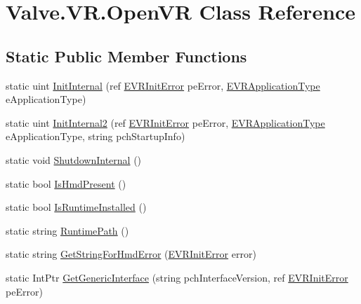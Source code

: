 \hypertarget{class_valve_1_1_v_r_1_1_open_v_r}{}\section{Valve.\+V\+R.\+Open\+VR Class Reference}
\label{class_valve_1_1_v_r_1_1_open_v_r}
\subsection*{Static Public Member Functions}
\begin{DoxyCompactItemize}
\item 
static uint \mbox{\hyperlink{class_valve_1_1_v_r_1_1_open_v_r_a416675ba428968a6da50f9490efce76b}{Init\+Internal}} (ref \mbox{\hyperlink{namespace_valve_1_1_v_r_a5d8a20b60549ae5b7668d73452c7e83e}{E\+V\+R\+Init\+Error}} pe\+Error, \mbox{\hyperlink{namespace_valve_1_1_v_r_a75c95b1b332a3c064198f2eac92ffe07}{E\+V\+R\+Application\+Type}} e\+Application\+Type)
\item 
static uint \mbox{\hyperlink{class_valve_1_1_v_r_1_1_open_v_r_addca6efca3552cea11254bf061387e77}{Init\+Internal2}} (ref \mbox{\hyperlink{namespace_valve_1_1_v_r_a5d8a20b60549ae5b7668d73452c7e83e}{E\+V\+R\+Init\+Error}} pe\+Error, \mbox{\hyperlink{namespace_valve_1_1_v_r_a75c95b1b332a3c064198f2eac92ffe07}{E\+V\+R\+Application\+Type}} e\+Application\+Type, string pch\+Startup\+Info)
\item 
static void \mbox{\hyperlink{class_valve_1_1_v_r_1_1_open_v_r_a65b9b06b7064db76e2e2db9de9e09083}{Shutdown\+Internal}} ()
\item 
static bool \mbox{\hyperlink{class_valve_1_1_v_r_1_1_open_v_r_a3586c9cb26b462671a12958e442ba58a}{Is\+Hmd\+Present}} ()
\item 
static bool \mbox{\hyperlink{class_valve_1_1_v_r_1_1_open_v_r_afcddd1daf2a59e882134e25a4368abd1}{Is\+Runtime\+Installed}} ()
\item 
static string \mbox{\hyperlink{class_valve_1_1_v_r_1_1_open_v_r_a1281abfb0a2afa7a761f0b4a5c8bb056}{Runtime\+Path}} ()
\item 
static string \mbox{\hyperlink{class_valve_1_1_v_r_1_1_open_v_r_a5295773435942add5ec89c21dd8074a3}{Get\+String\+For\+Hmd\+Error}} (\mbox{\hyperlink{namespace_valve_1_1_v_r_a5d8a20b60549ae5b7668d73452c7e83e}{E\+V\+R\+Init\+Error}} error)
\item 
static Int\+Ptr \mbox{\hyperlink{class_valve_1_1_v_r_1_1_open_v_r_a72b1be1a267229f304e1f8fb9b8c38a6}{Get\+Generic\+Interface}} (string pch\+Interface\+Version, ref \mbox{\hyperlink{namespace_valve_1_1_v_r_a5d8a20b60549ae5b7668d73452c7e83e}{E\+V\+R\+Init\+Error}} pe\+Error)

\end{DoxyCompactItemize}
